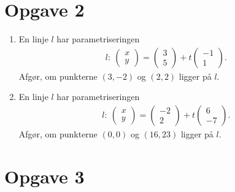 \section*{Opgave 2}
\begin{enumerate}[label=\roman*)]
	\item En linje $l$ har parametriseringen
	\begin{align*}
		l: \ 
		\begin{pmatrix}
			x \\ y
		\end{pmatrix}=
		\begin{pmatrix}
			3 \\5
		\end{pmatrix} + t
		\begin{pmatrix}
			-1 \\ 1
		\end{pmatrix}.
	\end{align*}
	Afgør, om punkterne $(3,-2)$ og $(2,2)$ ligger på $l$. 
	\item En linje $l$ har parametriseringen
	\begin{align*}
		l: \ 
		\begin{pmatrix}
			x \\ y
		\end{pmatrix}=
		\begin{pmatrix}
			-2 \\2
		\end{pmatrix} + t
		\begin{pmatrix}
			6 \\ -7  
		\end{pmatrix}.
	\end{align*}
	Afgør, om punkterne $(0,0)$ og $(16,23)$ ligger på $l$. 
\end{enumerate}

\section*{Opgave 3}

